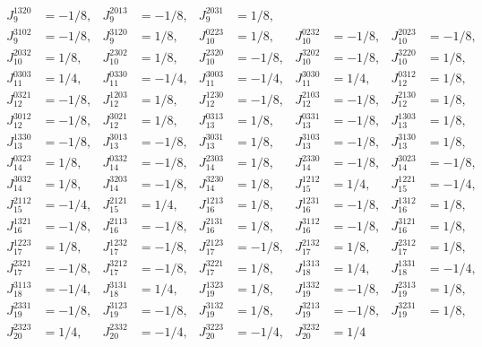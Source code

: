 \documentclass[a4paper,12pt, DIV=14, BCOR=5mm, twoside, headsepline, numbers=noenddot]{scrbook}
\begin{document}
\begin{align}
\begin{alignedat}{5}
J_{9}^{1320} &= -1/8, & 
J_{9}^{2013} &= -1/8, &
J_{9}^{2031} &= 1/8, \\ 
J_{9}^{3102} &= -1/8, & 
J_{9}^{3120} &= 1/8, & 
J_{10}^{0223} &= 1/8, & 
J_{10}^{0232} &= -1/8, &
J_{10}^{2023} &= -1/8, \\ 
J_{10}^{2032} &= 1/8, & 
J_{10}^{2302} &= 1/8, & 
J_{10}^{2320} &= -1/8, & 
J_{10}^{3202} &= -1/8, & 
J_{10}^{3220} &= 1/8, \\ 
J_{11}^{0303} &= 1/4, & 
J_{11}^{0330} &= -1/4, & 
J_{11}^{3003} &= -1/4, & 
J_{11}^{3030} &= 1/4, & 
J_{12}^{0312} &= 1/8, \\ 
J_{12}^{0321} &= -1/8, & 
J_{12}^{1203} &= 1/8, & 
J_{12}^{1230} &= -1/8, & 
J_{12}^{2103} &= -1/8, & 
J_{12}^{2130} &= 1/8, \\ 
J_{12}^{3012} &= -1/8, & 
J_{12}^{3021} &= 1/8, & 
J_{13}^{0313} &= 1/8, & 
J_{13}^{0331} &= -1/8, & 
J_{13}^{1303} &= 1/8, \\ 
J_{13}^{1330} &= -1/8, & 
J_{13}^{3013} &= -1/8, & 
J_{13}^{3031} &= 1/8, & 
J_{13}^{3103} &= -1/8, & 
J_{13}^{3130} &= 1/8, \\ 
J_{14}^{0323} &= 1/8, & 
J_{14}^{0332} &= -1/8, & 
J_{14}^{2303} &= 1/8, & 
J_{14}^{2330} &= -1/8, & 
J_{14}^{3023} &= -1/8, \\ 
J_{14}^{3032} &= 1/8, & 
J_{14}^{3203} &= -1/8, & 
J_{14}^{3230} &= 1/8, & 
J_{15}^{1212} &= 1/4, & 
J_{15}^{1221} &= -1/4, \\ 
J_{15}^{2112} &= -1/4, & 
J_{15}^{2121} &= 1/4, & 
J_{16}^{1213} &= 1/8, & 
J_{16}^{1231} &= -1/8, & 
J_{16}^{1312} &= 1/8, \\ 
J_{16}^{1321} &= -1/8, & 
J_{16}^{2113} &= -1/8, & 
J_{16}^{2131} &= 1/8, & 
J_{16}^{3112} &= -1/8, & 
J_{16}^{3121} &= 1/8, \\ 
J_{17}^{1223} &= 1/8, & 
J_{17}^{1232} &= -1/8, & 
J_{17}^{2123} &= -1/8, & 
J_{17}^{2132} &= 1/8, & 
J_{17}^{2312} &= 1/8, \\ 
J_{17}^{2321} &= -1/8, & 
J_{17}^{3212} &= -1/8, & 
J_{17}^{3221} &= 1/8, & 
J_{18}^{1313} &= 1/4, & 
J_{18}^{1331} &= -1/4, \\ 
J_{18}^{3113} &= -1/4, & 
J_{18}^{3131} &= 1/4, & 
J_{19}^{1323} &= 1/8, & 
J_{19}^{1332} &= -1/8, & 
J_{19}^{2313} &= 1/8, \\ 
J_{19}^{2331} &= -1/8, & 
J_{19}^{3123} &= -1/8, & 
J_{19}^{3132} &= 1/8, & 
J_{19}^{3213} &= -1/8, & 
J_{19}^{3231} &= 1/8, \\ 
J_{20}^{2323} &= 1/4, & 
J_{20}^{2332} &= -1/4, & 
J_{20}^{3223} &= -1/4, & 
J_{20}^{3232} &= 1/4  
    \end{alignedat}
\end{align}
\end{document}
